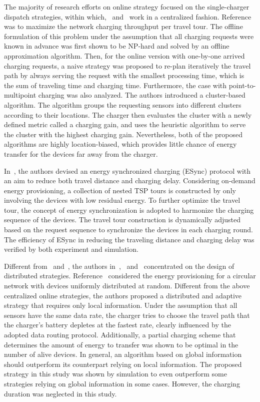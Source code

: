 \documentclass[twocolumn,10pt]{IEEEtran}
\begin{document}
 
The majority of research efforts on online strategy focused on the single-charger dispatch strategies, within which,~\cite{X.2014Ren} and~\cite{L.He2014} work in a centralized fashion. Reference~\cite{X.2014Ren} was to maximize the network charging throughput per travel tour. The offline formulation of this problem under the assumption that all charging requests were known in advance was first shown to be NP-hard and solved by an offline approximation algorithm. Then, for the online version with one-by-one arrived charging requests, a naive strategy was proposed to re-plan iteratively the travel path by always serving the request with the smallest processing time, which is the sum of traveling time and charging time. Furthermore, the case with point-to-multipoint charging was also analyzed. The authors introduced a cluster-based algorithm. The algorithm groups the requesting sensors into different clusters according to their locations. The charger then evaluates the cluster with a newly defined metric called a charging gain, and uses the heuristic algorithm to serve the cluster with the highest charging gain. Nevertheless, both of the proposed algorithms are highly location-biased, which provides little chance of energy transfer for the devices far away from the charger. 

In~\cite{L.He2014}, the authors devised an energy synchronized charging (ESync) protocol with an aim to reduce both travel distance and charging delay. Considering on-demand energy provisioning, a collection of nested TSP tours is constructed by only involving the devices with low residual energy. To further optimize the travel tour, the concept of energy synchronization is adopted to harmonize the charging sequence of the devices. The travel tour construction is dynamically adjusted based on the request sequence to synchronize the devices in each charging round. The efficiency of ESync in reducing the traveling distance and charging delay was verified by both experiment and simulation. 

Different from~\cite{X.2014Ren} and~\cite{L.He2014}, the authors in~\cite{M2013Angelopoulos},~\cite{L.HeTMC} and~\cite{L.2014Jiang} concentrated on the design of distributed strategies.
Reference~\cite{M2013Angelopoulos} considered the energy provisioning for a circular network with devices uniformly distributed at random. Different from the above centralized online strategies, the authors proposed a distributed and adaptive strategy that requires only local information. Under the assumption that all sensors have the same data rate, the charger tries to choose the travel path that the charger's battery depletes at the fastest rate, clearly influenced by the adopted data routing protocol. Additionally, a partial charging scheme that determines the amount of energy to transfer was shown to be optimal in the number of alive devices. In general, an algorithm based on global information should outperform its counterpart relying on local information. The proposed strategy in this study was shown by simulation to even outperform some strategies relying on global information in some cases. However, the charging duration was neglected in this study.
\end{document}
